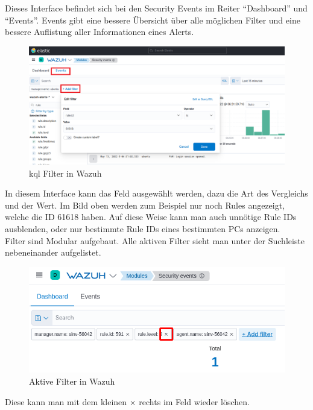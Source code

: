 Dieses Interface befindet sich bei den Security Events im Reiter ``Dashboard'' und ``Events''.
Events gibt eine bessere Übersicht über alle möglichen Filter und eine bessere Auflistung aller Informationen eines Alerts.
\begin{figure}[H]
    \centering
    \includegraphics[width=\linewidth]{../img/filter.png}
    \caption{\acrshort{kql} Filter in Wazuh}
\end{figure}

In diesem Interface kann das Feld ausgewählt werden, dazu die Art des Vergleichs und der Wert.
Im Bild oben werden zum Beispiel nur noch Rules angezeigt, welche die ID 61618 haben.
Auf diese Weise kann man auch unnötige Rule IDs ausblenden, oder nur bestimmte Rule IDs eines bestimmten PCs anzeigen.\\

Filter sind Modular aufgebaut. Alle aktiven Filter sieht man unter der Suchleiste nebeneinander aufgelistet.
\begin{figure}[H]
    \centering
    \includegraphics[width=\linewidth]{../img/aktive-filter.png}
    \caption{Aktive Filter in Wazuh}
\end{figure}
Diese kann man mit dem kleinen $\times$ rechts im Feld wieder löschen.\\

